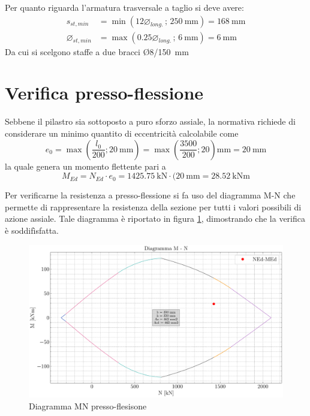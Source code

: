 Per quanto riguarda l'armatura trasversale a taglio si deve avere:
\begin{align}
    s_{st,min} &= \min\left( 12\varnothing_{long.} \, ; \, \SI{250}{\milli\metre} \right)= \SI{168}{\milli\metre}\\
    \varnothing_{st, min} &= \max\left( 0.25\varnothing_{long.} \, ; \, \SI{6}{\milli\metre} \right)= \SI{6}{\milli\metre}
\end{align}
Da cui si scelgono staffe a due bracci Ø8/\SI{150}{\milli\metre}

\section{Verifica presso-flessione}
Sebbene il pilastro sia sottoposto a puro sforzo assiale, la normativa richiede di considerare un minimo quantito di eccentricità calcolabile come
\[
    e_0 = \max \left(\frac{l_0}{200};  \SI{20}{\milli\metre} \right)  = \max \left(\frac{3500}{200};  20 \right)\si{\milli\metre} = \SI{20}{\milli\metre}
\]
la quale genera un momento flettente pari a 
\begin{equation}
    M_{Ed} = N_{Ed}\cdot e_0  = \SI{1425.75}{\kilo\newton} \cdot (\SI{20}{\milli\metre} = \SI{28.52}{\kilo\newton\metre}
\end{equation}

Per verificarne la resistenza a presso-flessione si fa uso del diagramma M-N che permette di rappresentare la resistenza della sezione  per tutti i valori possibili di azione assiale.
Tale diagramma è riportato in figura \ref{fig:MN_diagram_primo_ordine}, dimostrando che la verifica è soddifìsfatta.
\begin{figure}[H]
    \centering
    \includegraphics[width=\textwidth]{IMG/M_N_diagram_pilastro_primo_ordine.pdf}
    \caption{Diagramma MN presso-flesisone}
    \label{fig:MN_diagram_primo_ordine}
\end{figure}


